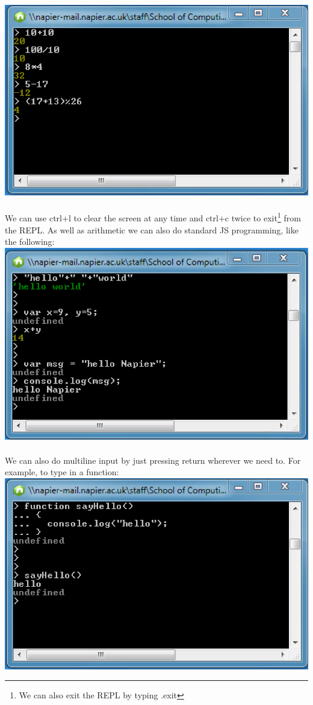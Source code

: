 \documentclass[10pt, a4paper, twosize]{article}
\begin{document}
\includegraphics[width=.8\textwidth]{images/node_repl-arithmetic}

\paragraph{} We can use ctrl+l to clear the screen at any time and ctrl+c twice to exit\footnote{We can also exit the REPL by typing .exit} from the REPL. As well as arithmetic we can also do standard JS programming, like the following:\\

\includegraphics[width=.8\textwidth]{images/node_repl-progamming}

\paragraph{} We can also do multiline input by just pressing return wherever we need to. For example, to type in a function:\\

\includegraphics[width=.8\textwidth]{images/node_repl-multi-line}
\end{document}
